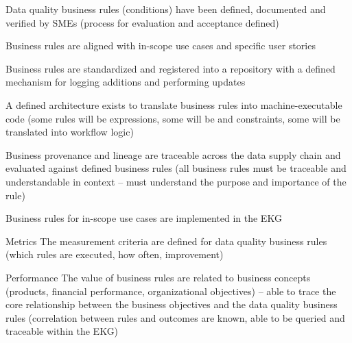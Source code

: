 \kgmmscoringsection

\kgmmscoringlevelOne

\begin{scoring}

  \item Data quality business rules (conditions) have been defined, documented and verified by SMEs (process for
        evaluation and acceptance defined)
  \item Business rules are aligned with in-scope use cases and specific user stories
  \item Business rules are standardized and registered into a repository with a defined mechanism for logging
        additions and performing updates

\end{scoring}

\kgmmscoringlevelTwo

\begin{scoring}

  \item A defined architecture exists to translate business rules into machine-executable code (some rules will be
         expressions, some will be  and constraints, some will be translated into
        workflow logic)
  \item Business provenance and lineage are traceable across the
        data supply chain and evaluated against defined business rules (all business rules
        must be traceable and understandable in context -- must understand the purpose and importance of the rule)
  \item Business rules for in-scope use cases are implemented in the EKG

\end{scoring}

\kgmmscoringlevelThree

\begin{scoring}

    \item [Metrics] The measurement criteria are defined for data quality business rules (which rules are executed,
          how often, improvement)
    \item [Performance] The value of business rules are related to business concepts (products, financial performance,
          organizational objectives) -- able to trace the core relationship between the business objectives and
          the data quality business rules (correlation between rules and outcomes are known, able to be queried and
          traceable within the EKG)

\end{scoring}

